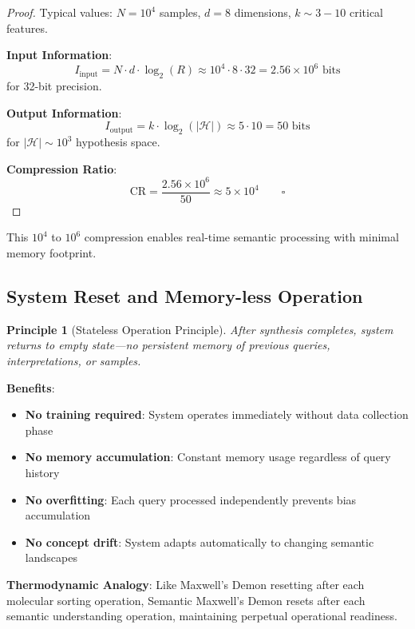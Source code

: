 \documentclass[12pt,a4paper]{article}
\newtheorem{principle}{Principle}
\begin{document}
\begin{proof}
Typical values: $N = 10^4$ samples, $d = 8$ dimensions, $k \sim 3-10$ critical features.

\textbf{Input Information}:
\begin{equation}
I_{\text{input}} = N \cdot d \cdot \log_2(R) \approx 10^4 \cdot 8 \cdot 32 = 2.56 \times 10^6 \text{ bits}
\end{equation}
for 32-bit precision.

\textbf{Output Information}:
\begin{equation}
I_{\text{output}} = k \cdot \log_2(|\mathcal{H}|) \approx 5 \cdot 10 = 50 \text{ bits}
\end{equation}
for $|\mathcal{H}| \sim 10^3$ hypothesis space.

\textbf{Compression Ratio}:
\begin{equation}
\text{CR} = \frac{2.56 \times 10^6}{50} \approx 5 \times 10^4 \qquad \square
\end{equation}
\end{proof}

This $10^4$ to $10^6$ compression enables real-time semantic processing with minimal memory footprint.

\subsection{System Reset and Memory-less Operation}

\begin{principle}[Stateless Operation Principle]
After synthesis completes, system returns to empty state—no persistent memory of previous queries, interpretations, or samples.
\end{principle}

\textbf{Benefits}:
\begin{itemize}
\item \textbf{No training required}: System operates immediately without data collection phase
\item \textbf{No memory accumulation}: Constant memory usage regardless of query history
\item \textbf{No overfitting}: Each query processed independently prevents bias accumulation
\item \textbf{No concept drift}: System adapts automatically to changing semantic landscapes
\end{itemize}

\textbf{Thermodynamic Analogy}: Like Maxwell's Demon resetting after each molecular sorting operation, Semantic Maxwell's Demon resets after each semantic understanding operation, maintaining perpetual operational readiness.
\end{document}
